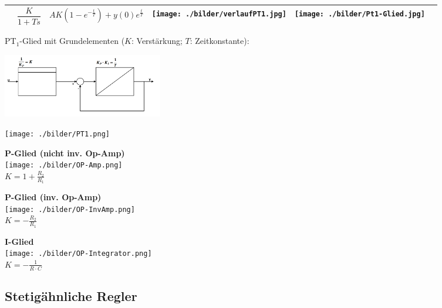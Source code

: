 \begin{tabular}{|l|l|l|l|l|l|}
		 & $\dfrac{K}{1+Ts}$
    	 & $AK(1-e^{-\frac{t}{T}})+y(0)e^{\frac{t}{T}}$
    	 & \begin{minipage}{2.4cm}
         \texttt{[image: ./bilder/verlaufPT1.jpg]}
         \end{minipage}
    	& \begin{minipage}{2.4cm}
         \texttt{[image: ./bilder/Pt1-Glied.jpg]}
         \end{minipage}\\
    	\hline
    \end{tabular}
		
    PT$_1$-Glied mit Grundelementen ($K$: Verstärkung; $T$: Zeitkonstante):\\
		\begin{minipage}{10cm}
			\includegraphics[width=7cm]{./bilder/PT1_2.png}
		\end{minipage}
		\begin{minipage}{8cm}
			\texttt{[image: ./bilder/PT1.png]}
		\end{minipage}

    \begin{multicols}{3}
    \textbf{P-Glied (nicht inv. Op-Amp)} \\
    \texttt{[image: ./bilder/OP-Amp.png]} \\
    $K = 1 + \frac{R_2}{R_1}$ 
    \columnbreak

	\textbf{P-Glied (inv. Op-Amp)} \\ 
	\texttt{[image: ./bilder/OP-InvAmp.png]} \\
	$K=-\frac{R_2}{R_1}$
    \columnbreak
        
    \textbf{I-Glied} \\ 
    \texttt{[image: ./bilder/OP-Integrator.png]}\\
    $K = - \frac{1}{R \cdot C}$
    \end{multicols}

	\subsection{Stetigähnliche Regler}
